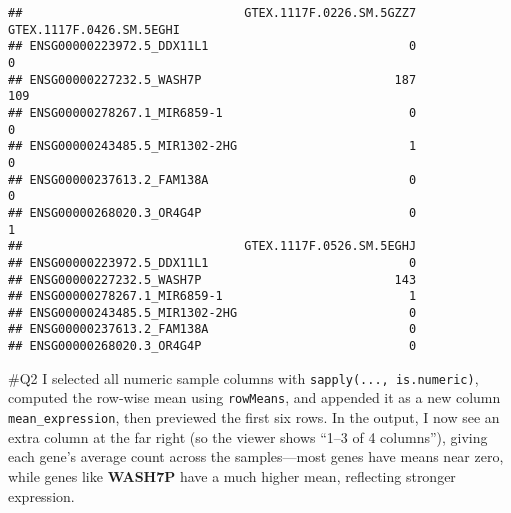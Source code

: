 \documentclass[
]{article}
\newenvironment{Shaded}{\begin{snugshade}}{\end{snugshade}}
\newcommand{\AttributeTok}[1]{\textcolor[rgb]{0.13,0.29,0.53}{#1}}
\newcommand{\CommentTok}[1]{\textcolor[rgb]{0.56,0.35,0.01}{\textit{#1}}}
\newcommand{\ConstantTok}[1]{\textcolor[rgb]{0.56,0.35,0.01}{#1}}
\newcommand{\FunctionTok}[1]{\textcolor[rgb]{0.13,0.29,0.53}{\textbf{#1}}}
\newcommand{\NormalTok}[1]{#1}
\newcommand{\OtherTok}[1]{\textcolor[rgb]{0.56,0.35,0.01}{#1}}
\newcommand{\SpecialCharTok}[1]{\textcolor[rgb]{0.81,0.36,0.00}{\textbf{#1}}}
\begin{document}
\begin{verbatim}
##                               GTEX.1117F.0226.SM.5GZZ7 GTEX.1117F.0426.SM.5EGHI
## ENSG00000223972.5_DDX11L1                            0                        0
## ENSG00000227232.5_WASH7P                           187                      109
## ENSG00000278267.1_MIR6859-1                          0                        0
## ENSG00000243485.5_MIR1302-2HG                        1                        0
## ENSG00000237613.2_FAM138A                            0                        0
## ENSG00000268020.3_OR4G4P                             0                        1
##                               GTEX.1117F.0526.SM.5EGHJ
## ENSG00000223972.5_DDX11L1                            0
## ENSG00000227232.5_WASH7P                           143
## ENSG00000278267.1_MIR6859-1                          1
## ENSG00000243485.5_MIR1302-2HG                        0
## ENSG00000237613.2_FAM138A                            0
## ENSG00000268020.3_OR4G4P                             0
\end{verbatim}

\#Q2 I selected all numeric sample columns with
\texttt{sapply(...,\ is.numeric)}, computed the row‐wise mean using
\texttt{rowMeans}, and appended it as a new column
\texttt{mean\_expression}, then previewed the first six rows. In the
output, I now see an extra column at the far right (so the viewer shows
``1--3 of 4 columns''), giving each gene's average count across the
samples---most genes have means near zero, while genes like
\textbf{WASH7P} have a much higher mean, reflecting stronger expression.

\begin{Shaded}
\end{Shaded}
\end{document}
